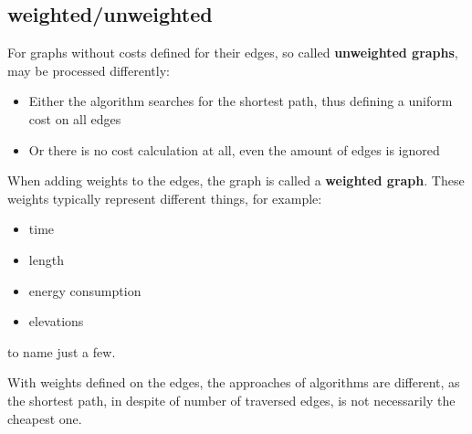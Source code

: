 \subsection{weighted/unweighted}

For graphs without costs defined for their edges, so called \textbf{unweighted graphs}, may be processed differently: 
\begin{itemize}
\item Either the algorithm searches for the shortest path, thus defining a uniform cost on all edges
\item Or there is no cost calculation at all, even the amount of edges is ignored
\end{itemize}

When adding weights to the edges, the graph is called a \textbf{weighted graph}. These weights typically represent different things, for example:
\begin{itemize}
\item time
\item length
\item energy consumption
\item elevations
\end{itemize}
to name just a few.

With weights defined on the edges, the approaches of algorithms are different, as the shortest path, in despite of number of traversed edges, is not necessarily the cheapest one. 



